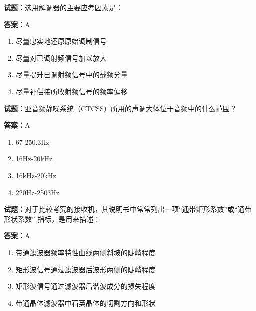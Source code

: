 \documentclass{ctexbook}
\begin{document}




\vspace{1em}

\textbf{试题：}选用解调器的主要应考因素是： 

\textbf{答案：}A 

\begin{enumerate}[leftmargin=3em]
  \item 尽量忠实地还原原始调制信号 

  \item 尽量对已调射频信号加以放大 

  \item 尽量提升已调射频信号中的载频分量 

  \item 尽量补偿接所收射频信号的频率偏移 

\end{enumerate}





\vspace{1em}

\textbf{试题：}亚音频静噪系统（CTCSS）所用的声调大体位于音频中的什么范围？ 

\textbf{答案：}A 

\begin{enumerate}[leftmargin=3em]
  \item 67-250.3Hz 

  \item 16Hz-20kHz 

  \item 16kHz-20kHz 

  \item 220Hz-2503Hz 

\end{enumerate}





\vspace{1em}

\textbf{试题：}对于比较考究的接收机，其说明书中常常列出一项“通带矩形系数”或“通带形状系数”
指标，是用来描述： 

\textbf{答案：}A 

\begin{enumerate}[leftmargin=3em]
  \item 带通滤波器频率特性曲线两侧斜坡的陡峭程度 

  \item 矩形波信号通过滤波器后波形两侧的陡峭程度 

  \item 矩形波信号通过滤波器后谐波成分的损失程度 

  \item 带通晶体滤波器中石英晶体的切割方向和形状 

\end{enumerate}
\end{document}
